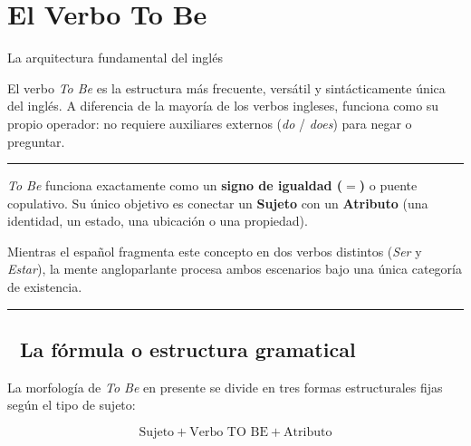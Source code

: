 \documentclass[
  spanish,
  letterpaper,
]{scrbook}
\begin{document}
\chapter{El Verbo To Be}\label{el-verbo-to-be}

La arquitectura fundamental del inglés

\hfill\break

El verbo \emph{To Be} es la estructura más frecuente, versátil y
sintácticamente única del inglés. A diferencia de la mayoría de los
verbos ingleses, funciona como su propio operador: no requiere
auxiliares externos (\emph{do} / \emph{does}) para negar o preguntar.

\begin{center}\rule{0.5\linewidth}{0.5pt}\end{center}

\begin{tcolorbox}[enhanced jigsaw, opacityback=0, toptitle=1mm, toprule=.15mm, leftrule=.75mm, colframe=quarto-callout-note-color-frame, coltitle=black, opacitybacktitle=0.6, rightrule=.15mm, titlerule=0mm, bottomtitle=1mm, arc=.35mm, left=2mm, colback=white, breakable, bottomrule=.15mm, title={🎯 La idea central}, colbacktitle=quarto-callout-note-color!10!white]

\emph{To Be} funciona exactamente como un \textbf{signo de igualdad
(\(=\))} o puente copulativo. Su único objetivo es conectar un
\textbf{Sujeto} con un \textbf{Atributo} (una identidad, un estado, una
ubicación o una propiedad).

Mientras el español fragmenta este concepto en dos verbos distintos
(\emph{Ser} y \emph{Estar}), la mente angloparlante procesa ambos
escenarios bajo una única categoría de existencia.

\end{tcolorbox}

\begin{center}\rule{0.5\linewidth}{0.5pt}\end{center}

\section{📐 La fórmula o estructura
gramatical}\label{la-fuxf3rmula-o-estructura-gramatical}

La morfología de \emph{To Be} en presente se divide en tres formas
estructurales fijas según el tipo de sujeto:

\[\text{Sujeto} + \text{Verbo TO BE} + \text{Atributo}\]
\end{document}
